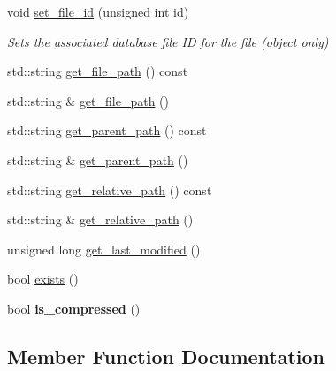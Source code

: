 \begin{DoxyCompactItemize}
\item 
\mbox{\label{class_backup_1_1_file_1_1_backup_file_af6e942ac6788f1793c9e530ce0e6dd0e}} 
void \hyperlink{class_backup_1_1_file_1_1_backup_file_af6e942ac6788f1793c9e530ce0e6dd0e}{set\+\_\+file\+\_\+id} (unsigned int id)
\begin{DoxyCompactList}\small\item\em Sets the associated database file ID for the file (object only) \end{DoxyCompactList}\item 
std\+::string \hyperlink{class_backup_1_1_file_1_1_backup_file_adad544ac9e93f4f45d1e1b56f7b2abc7}{get\+\_\+file\+\_\+path} () const
\item 
std\+::string \& \hyperlink{class_backup_1_1_file_1_1_backup_file_af0c9761572152255eb0e8ad6a99f7c91}{get\+\_\+file\+\_\+path} ()
\item 
std\+::string \hyperlink{class_backup_1_1_file_1_1_backup_file_a0131847a659a205885c5d6bfe324279d}{get\+\_\+parent\+\_\+path} () const
\item 
std\+::string \& \hyperlink{class_backup_1_1_file_1_1_backup_file_a2fd027d95d6e10aac23379989b78852b}{get\+\_\+parent\+\_\+path} ()
\item 
std\+::string \hyperlink{class_backup_1_1_file_1_1_backup_file_a1062ef23e1453ee672b7462b38fe76f7}{get\+\_\+relative\+\_\+path} () const
\item 
std\+::string \& \hyperlink{class_backup_1_1_file_1_1_backup_file_ac121d19028b1b5e95736e4416c73d6e3}{get\+\_\+relative\+\_\+path} ()
\item 
unsigned long \hyperlink{class_backup_1_1_file_1_1_backup_file_a2843c00b113857cc49f7494dab6f97b2}{get\+\_\+last\+\_\+modified} ()
\item 
bool \hyperlink{class_backup_1_1_file_1_1_backup_file_aed1719ae2bca1a1253956b4fd62a3383}{exists} ()
\item 
\mbox{\label{class_backup_1_1_file_1_1_backup_file_a0556ed7ff0c08953d70398c83966892e}} 
bool {\bfseries is\+\_\+compressed} ()
\end{DoxyCompactItemize}


\subsection{Member Function Documentation}
\mbox{\label{class_backup_1_1_file_1_1_backup_file_aed1719ae2bca1a1253956b4fd62a3383}} 
